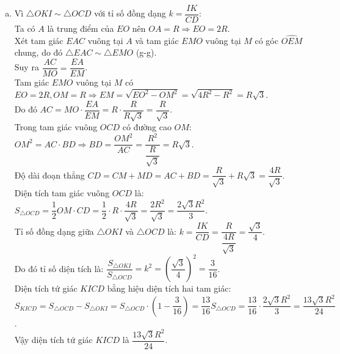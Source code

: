 \begin{bt}
{\begin{enumerate}[a)]
    Trong tam giác vuông $OCD$ có $OM \perp CD$ tại $M$, áp dụng hệ thức lượng ta có:
    $OI \cdot OC = OM^2 = OK \cdot OD \Rightarrow \dfrac{OI}{OD} = \dfrac{OK}{OC}$.\\
    Xét $\triangle OKI$ và $\triangle OCD$ có:
    $\left\{\begin{aligned} &\widehat{COD}\text{ là góc chung} \\ &\dfrac{OI}{OD} = \dfrac{OK}{OC}\text{ (chứng minh trên)}. \end{aligned}\right.$\\
    Do đó $\triangle OKI \sim \triangle OCD$ (c-g-c).
    \item Vì $\triangle OKI \sim \triangle OCD$ với tỉ số đồng dạng $k = \dfrac{IK}{CD}$:\\
    Ta có $A$ là trung điểm của $EO$ nên $OA = R \Rightarrow EO = 2R$.\\
    Xét tam giác $EAC$ vuông tại $A$ và tam giác $EMO$ vuông tại $M$ có góc $\widehat{OEM}$ chung, do đó $\triangle EAC \sim \triangle EMO$ (g-g).\\
    Suy ra $\dfrac{AC}{MO} = \dfrac{EA}{EM}$.\\
    Tam giác $EMO$ vuông tại $M$ có $EO = 2R, OM = R \Rightarrow EM = \sqrt{EO^2 - OM^2} = \sqrt{4R^2 - R^2} = R\sqrt{3}$.\\
    Do đó $AC = MO \cdot \dfrac{EA}{EM} = R \cdot \dfrac{R}{R\sqrt{3}} = \dfrac{R}{\sqrt{3}}$.\\
    Trong tam giác vuông $OCD$ có đường cao $OM$:
    $OM^2 = AC \cdot BD \Rightarrow BD = \dfrac{OM^2}{AC} = \dfrac{R^2}{\dfrac{R}{\sqrt{3}}} = R\sqrt{3}$.\\
    Độ dài đoạn thẳng $CD = CM + MD = AC + BD = \dfrac{R}{\sqrt{3}} + R\sqrt{3} = \dfrac{4R}{\sqrt{3}}$.\\
    Diện tích tam giác vuông $OCD$ là:
    $S_{\triangle OCD} = \dfrac{1}{2} OM \cdot CD = \dfrac{1}{2} \cdot R \cdot \dfrac{4R}{\sqrt{3}} = \dfrac{2R^2}{\sqrt{3}} = \dfrac{2\sqrt{3}R^2}{3}$.\\
    Tỉ số đồng dạng giữa $\triangle OKI$ và $\triangle OCD$ là:
    $k = \dfrac{IK}{CD} = \dfrac{R}{\dfrac{4R}{\sqrt{3}}} = \dfrac{\sqrt{3}}{4}$.\\
    Do đó tỉ số diện tích là:
    $\dfrac{S_{\triangle OKI}}{S_{\triangle OCD}} = k^2 = \left(\dfrac{\sqrt{3}}{4}\right)^2 = \dfrac{3}{16}$.\\
    Diện tích tứ giác $KICD$ bằng hiệu diện tích hai tam giác:
    $S_{KICD} = S_{\triangle OCD} - S_{\triangle OKI} = S_{\triangle OCD} \cdot \left(1 - \dfrac{3}{16}\right) = \dfrac{13}{16} S_{\triangle OCD} = \dfrac{13}{16} \cdot \dfrac{2\sqrt{3}R^2}{3} = \dfrac{13\sqrt{3}R^2}{24}$.\\
    Vậy diện tích tứ giác $KICD$ là $\dfrac{13\sqrt{3}R^2}{24}$.
\end{enumerate}
}
\end{bt}

